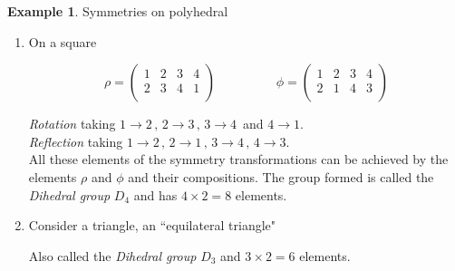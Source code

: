 \documentclass[11pt,a4paper]{article}
\theoremstyle{definition}
\newtheorem{exa}[thm]{Example}
\begin{document}
\begin{exa}
Symmetries on polyhedral
\end{exa}
\begin{enumerate}
\item On a square \hspace{0.6cm}

\begin{figure}[H]
\centering
{}
\end{figure}











$$\rho = \begin{pmatrix}
1 & 2 & 3 & 4\\
2 & 3 & 4 & 1\\
\end{pmatrix}\hspace{2cm} \phi = \begin{pmatrix}
1 & 2 & 3 & 4\\
2 & 1 & 4 & 3\\
\end{pmatrix}$$

\textit{Rotation} taking $1\rightarrow 2\, ,\, 2\rightarrow 3\, ,\, 3\rightarrow 4\, $ and $4\rightarrow 1$.\\
\textit{Reflection}  taking $1\rightarrow 2\, ,\, 2\rightarrow 1\, , \,  3\rightarrow 4\,  , \, 4\rightarrow 3$.\\

All these elements of the symmetry transformations can be achieved by the elements $\rho$ and $\phi$ and their compositions. The group formed is called the \textit{Dihedral group} $D_4$ and has $4\times 2 = 8$ elements.\\


\item Consider a triangle, an ``equilateral triangle"


\begin{figure}[H]
\centering
{}
\end{figure}












Also called the \textit{Dihedral group} $D_3$ and $3\times 2 = 6$ elements.\\\\
\end{enumerate}
\end{document}
